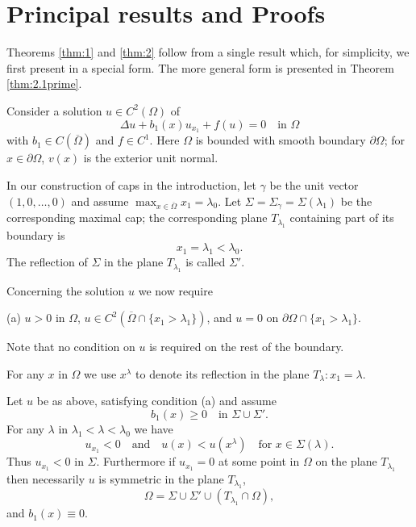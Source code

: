 \section{Principal results and Proofs}

\setcounter{theorem}{0}

Theorems \ref{thm:1} and \ref{thm:2} follow from a single result which,
for simplicity, we first present in a special form. The more general form is presented in
Theorem \ref{thm:2.1prime}.

Consider a solution $u\in C^2(\Omega)$ of
\begin{equation}\label{eq:2.1}
  \Delta u + b_1(x)u_{x_1} + f(u) = 0 \quad \text{in } \Omega
\end{equation}
with $b_1\in C(\overline{\Omega})$ and $f\in C^1$.
Here $\Omega$ is bounded with smooth boundary $\partial\Omega$;
for $x\in\partial\Omega$, $v(x)$ is the exterior unit normal.

In our construction of caps in the introduction, let $\gamma$ be the unit vector
$(1,0,\ldots,0)$ and assume $\max_{x\in\overline{\Omega}} x_1 = \lambda_0$.
Let $\Sigma = \Sigma_\gamma = \Sigma(\lambda_1)$ be the corresponding maximal cap;
the corresponding plane $T_{\lambda_1}$ containing part of its boundary is
\[x_1 = \lambda_1 < \lambda_0.\]
The reflection of $\Sigma$ in the plane $T_{\lambda_1}$ is called $\Sigma'$.

Concerning the solution $u$ we now require

(a) $u>0$ in $\Omega$, $u\in C^2(\overline{\Omega}\cap\{x_1>\lambda_1\})$,
and $u=0$ on $\partial\Omega\cap\{x_1>\lambda_1\}$.

Note that no condition on $u$ is required on the rest of the boundary.

For any $x$ in $\Omega$ we use $x^\lambda$ to denote its reflection in the plane
$T_\lambda : x_1=\lambda$.

\begin{theorem}\label{thm:2.1}
  Let $u$ be as above, satisfying condition (a) and assume
  \[b_1(x) \geq 0 \quad \text{in } \Sigma\cup\Sigma'.\]
  For any $\lambda$ in $\lambda_1 < \lambda < \lambda_0$ we have
  \begin{equation}\label{eq:2.2}
    u_{x_1} < 0\quad \text{and} \quad u(x) < u(x^\lambda) \quad \text{for } x\in \Sigma(\lambda).
  \end{equation}
  Thus $u_{x_1}<0$ in $\Sigma$. Furthermore if $u_{x_1} = 0$
  at some point in $\Omega$ on the plane $T_{\lambda_1}$
  then necessarily $u$ is symmetric in the plane $T_{\lambda_1}$,
  \begin{equation}\label{eq:2.3}
    \Omega = \Sigma\cup\Sigma'\cup(T_{\lambda_1}\cap\Omega),
  \end{equation}
  and $b_1(x)\equiv 0$.
\end{theorem}

